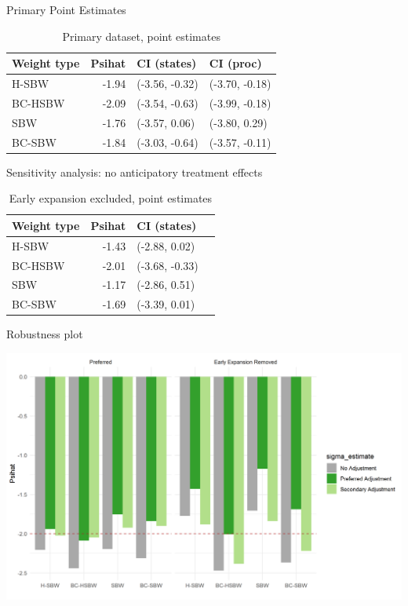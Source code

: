 \documentclass[hyperref={pdfpagelabels=false}]{beamer}
\begin{document}
\begin{frame}{Primary Point Estimates}

\begin{table}[ht]
\begin{tabular}{lrll}
  \toprule
Weight type & Psihat & CI (states) & CI (proc) \\ 
  \midrule
H-SBW & -1.94 & (-3.56, -0.32) & (-3.70, -0.18) \\ 
  BC-HSBW & -2.09 & (-3.54, -0.63) & (-3.99, -0.18) \\ 
  SBW & -1.76 & (-3.57, 0.06) & (-3.80, 0.29) \\ 
  BC-SBW & -1.84 & (-3.03, -0.64) & (-3.57, -0.11) \\ 
   \bottomrule
\end{tabular}
\caption{Primary dataset, point estimates}
\end{table}
\end{frame}

\begin{frame}{Sensitivity analysis: no anticipatory treatment effects}
    \begin{table}[ht]
\centering
\begin{table}[ht]
\begin{tabular}{lrll}
  \toprule
Weight type & Psihat & CI (states) \\ 
  \midrule
H-SBW & -1.43 & (-2.88, 0.02) \\ 
  BC-HSBW & -2.01 & (-3.68, -0.33) \\ 
  SBW & -1.17 & (-2.86, 0.51) \\ 
  BC-SBW & -1.69 & (-3.39, 0.01) \\ 
   \bottomrule
\end{tabular}
\end{table}
\caption{Early expansion excluded, point estimates}
\label{tab:confintmainc2}
\end{table}
\end{frame}

\begin{frame}{Robustness plot}

\begin{center}
	\includegraphics[scale=0.5]{01_Plots/all-estimates-c1c2.png}
\end{center}
\end{frame}
\end{document}
